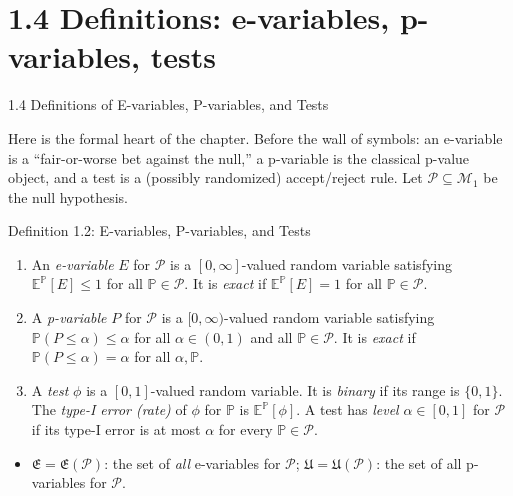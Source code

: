 \documentclass[aspectratio=169,10pt]{beamer}
\begin{document}
\section{1.4 Definitions: e-variables, p-variables, tests}

\begin{frame}[allowframebreaks]{1.4 Definitions of E-variables, P-variables, and Tests}

Here is the formal heart of the chapter. Before the wall of symbols: an
e-variable is a ``fair-or-worse bet against the null,'' a p-variable is
the classical p-value object, and a test is a (possibly randomized)
accept/reject rule. Let $\mathcal{P}\subseteq\mathcal{M}_1$ be the null
hypothesis.

\begin{block}{Definition 1.2: E-variables, P-variables, and Tests}
\begin{enumerate}
  \item[(i)] An \emph{e-variable} $E$ for $\mathcal{P}$ is a
    $[0,\infty]$-valued random variable satisfying
    $\mathbb{E}^{\mathbb{P}}[E]\le 1$ for all $\mathbb{P}\in\mathcal{P}$.
    It is \emph{exact} if $\mathbb{E}^{\mathbb{P}}[E]=1$ for all
    $\mathbb{P}\in\mathcal{P}$.
  \item[(ii)] A \emph{p-variable} $P$ for $\mathcal{P}$ is a
    $[0,\infty)$-valued random variable satisfying
    $\mathbb{P}(P\le\alpha)\le\alpha$ for all $\alpha\in(0,1)$ and all
    $\mathbb{P}\in\mathcal{P}$. It is \emph{exact} if
    $\mathbb{P}(P\le\alpha)=\alpha$ for all $\alpha,\mathbb{P}$.
  \item[(iii)] A \emph{test} $\phi$ is a $[0,1]$-valued random variable. It
    is \emph{binary} if its range is $\{0,1\}$. The \emph{type-I error
    (rate)} of $\phi$ for $\mathbb{P}$ is $\mathbb{E}^{\mathbb{P}}[\phi]$.
    A test has \emph{level} $\alpha\in[0,1]$ for $\mathcal{P}$ if its
    type-I error is at most $\alpha$ for every $\mathbb{P}\in\mathcal{P}$.
\end{enumerate}
\end{block}

\begin{itemize}
  \item $\mathfrak{E}=\mathfrak{E}(\mathcal{P})$: the set of \emph{all}
    e-variables for $\mathcal{P}$; $\mathfrak{U}=\mathfrak{U}(\mathcal{P})$:
    the set of all p-variables for $\mathcal{P}$.
\end{itemize}


\end{frame}
\end{document}
